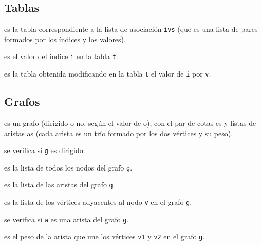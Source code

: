 \subsection{Tablas}
\begin{enumerate*}
\item {} es la tabla correspondiente a la lista de
  asociación \verb|ivs| (que es una lista de pares formados por los
  índices y los valores).
\item {} es el valor del índice \verb|i| en la tabla
  \verb|t|.
\item {} es la tabla obtenida modificando en la
  tabla \verb|t| el valor de \verb|i| por \verb|v|.
\end{enumerate*}

\subsection{Grafos}
\begin{enumerate*}
  \item {} es un grafo (dirigido o no, según el valor
    de o), con el par de cotas cs y listas de aristas as (cada arista es un
    trío formado por los dos vértices y su peso).
  \item {} se verifica si \verb|g| es dirigido.
  \item {} es la lista de todos los nodos del grafo \verb|g|.
  \item {} es la lista de las aristas del grafo \verb|g|.
  \item {} es la lista de los vértices adyacentes al nodo
    \verb|v| en el grafo \verb|g|.
  \item {} se verifica si \verb|a| es una arista del grafo
    \verb|g|.
  \item {} es el peso de la arista que une los vértices
    \verb|v1| y \verb|v2| en el grafo \verb|g|.
\end{enumerate*}
